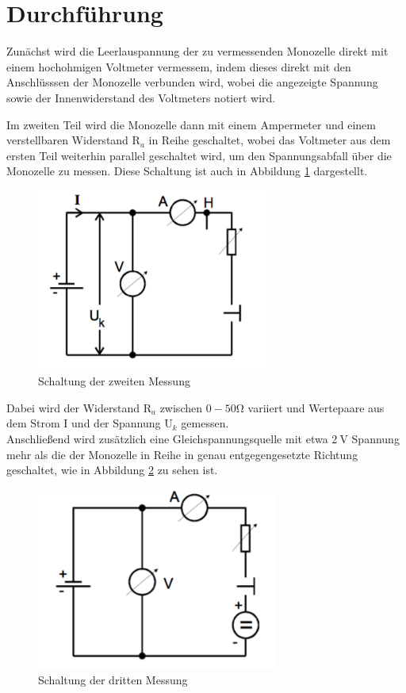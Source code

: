\section{Durchführung}
Zunächst wird die Leerlauspannung der zu vermessenden Monozelle direkt mit einem
hochohmigen Voltmeter vermessem, indem dieses direkt mit den Anschlüsssen der Monozelle
verbunden wird, wobei die angezeigte Spannung sowie der Innenwiderstand des
Voltmeters notiert wird.


\noindent Im zweiten Teil wird die Monozelle dann mit einem Ampermeter und einem
verstellbaren Widerstand $\text{R}_a $ in Reihe geschaltet, wobei das Voltmeter
aus dem ersten Teil weiterhin parallel geschaltet wird, um den Spannungsabfall über
die Monozelle zu messen. Diese Schaltung ist auch in Abbildung \ref{fig:schalt2}
dargestellt.
\begin{figure}[H]
  \centering
  \includegraphics[height=6cm]{schalt2.png}
  \caption{Schaltung der zweiten Messung \cite{skript}}
  \label{fig:schalt2}
\end{figure}
\noindent Dabei wird der Widerstand $\text{R}_a $ zwischen $ 0 - 50 \si{\ohm}$ variiert
und Wertepaare aus dem Strom I und der Spannung $\text{U}_k $ gemessen. \\
\noindent Anschließend wird zusätzlich eine Gleichspannungsquelle mit etwa $\SI{2}{\volt}$
Spannung mehr als die der Monozelle in Reihe in genau entgegengesetzte Richtung
geschaltet, wie in Abbildung \ref{fig:schalt3} zu sehen ist.
\begin{figure}[H]
  \centering
  \includegraphics[height=6cm]{schalt3.png}
  \caption{Schaltung der dritten Messung \cite{skript} }
  \label{fig:schalt3}
\end{figure}
